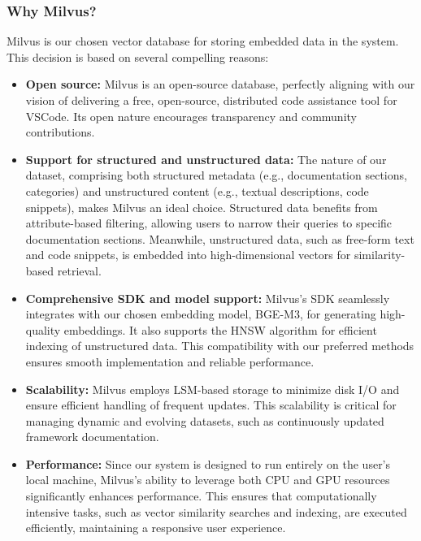 \subsubsection*{Why Milvus?}

Milvus is our chosen vector database for storing embedded data in the system. This decision is based on several compelling reasons:

\begin{itemize}
    \item \textbf{Open source:} 
    Milvus is an open-source database, perfectly aligning with our vision of delivering a free, open-source, distributed code assistance tool for VSCode. Its open nature encourages transparency and community contributions.

    \item \textbf{Support for structured and unstructured data:} 
    The nature of our dataset, comprising both structured metadata (e.g., documentation sections, categories) and unstructured content (e.g., textual descriptions, code snippets), makes Milvus an ideal choice. Structured data benefits from attribute-based filtering, allowing users to narrow their queries to specific documentation sections. Meanwhile, unstructured data, such as free-form text and code snippets, is embedded into high-dimensional vectors for similarity-based retrieval.

    \item \textbf{Comprehensive SDK and model support:} 
    Milvus's SDK seamlessly integrates with our chosen embedding model, BGE-M3, for generating high-quality embeddings. It also supports the HNSW algorithm for efficient indexing of unstructured data. This compatibility with our preferred methods ensures smooth implementation and reliable performance.

    \item \textbf{Scalability:} 
    Milvus employs LSM-based storage to minimize disk I/O and ensure efficient handling of frequent updates. This scalability is critical for managing dynamic and evolving datasets, such as continuously updated framework documentation.

    \item \textbf{Performance:} 
    Since our system is designed to run entirely on the user's local machine, Milvus's ability to leverage both CPU and GPU resources significantly enhances performance. This ensures that computationally intensive tasks, such as vector similarity searches and indexing, are executed efficiently, maintaining a responsive user experience.
\end{itemize}

